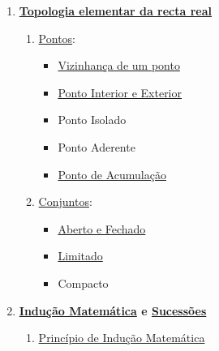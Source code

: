 \documentclass[12pt]{article}
\begin{document}
\begin{multicols}{2}
\begin{enumerate}[label=\arabic*.]
	
	\item {\bfseries 
		\hyperref[topologia elementar na reta r]
		{Topologia elementar da recta real}
	}
	\begin{enumerate}
	[label=\theenumi\arabic*., left = -5.4mm]
		
		\item \hyperref[pontos]{Pontos}:
		\begin{itemize}[left = -9mm]
		
			\item \hyperref[vizinhanca]
				 {Vizinhança de um ponto}
				 
			\item \hyperref[interior]
				 {Ponto Interior e Exterior}
				 
			\item Ponto Isolado
			\item Ponto Aderente
			\item \hyperref[ponto de acumulacao]
				 {Ponto de Acumulação}
			
		\end{itemize}
		
		\item \hyperref[conjuntos]{Conjuntos}:
		\begin{itemize}[left = -9mm]
		
			\item \hyperref[conjunto aberto]
				 {Aberto e Fechado}
				 
			\item \hyperref[conjunto limitado]
				 {Limitado}
				 
			\item Compacto
		
		\end{itemize}
		
	\end{enumerate}
	
	\vspace{3mm}
	
	\item {\bfseries 
		\hyperref[inducao matematica]{Indução Matemática}
		e \hyperref[sucessoes]{Sucessões}
	}
	\begin{enumerate}
	[label=\theenumi\arabic*., left = -5.4mm]
	
		\item \hyperref[inducao matematica]
			 {Princípio de Indução Matemática}
		

\end{enumerate}
\end{enumerate}
\end{multicols}
\end{document}
